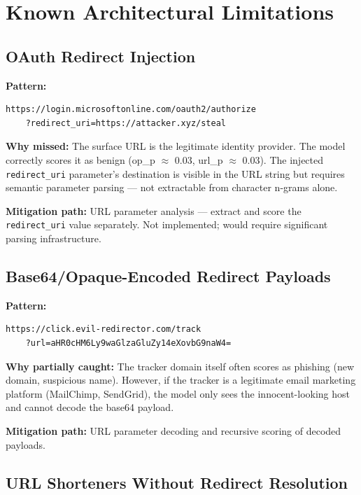\documentclass[11pt,a4paper]{article}
\newcommand{\code}[1]{\texttt{#1}}
\begin{document}
\section{Known Architectural Limitations}

\subsection{OAuth Redirect Injection}

\textbf{Pattern:}
\begin{lstlisting}
https://login.microsoftonline.com/oauth2/authorize
    ?redirect_uri=https://attacker.xyz/steal
\end{lstlisting}

\textbf{Why missed:} The surface URL is the legitimate identity
provider. The model correctly scores it as benign (op\_p $\approx$
0.03, url\_p $\approx$ 0.03). The injected \code{redirect\_uri}
parameter's destination is visible in the URL string but requires
semantic parameter parsing --- not extractable from character n-grams
alone.

\textbf{Mitigation path:} URL parameter analysis --- extract and score
the \code{redirect\_uri} value separately. Not implemented; would
require significant parsing infrastructure.

\subsection{Base64/Opaque-Encoded Redirect Payloads}

\textbf{Pattern:}
\begin{lstlisting}
https://click.evil-redirector.com/track
    ?url=aHR0cHM6Ly9waGlzaGluZy14eXovbG9naW4=
\end{lstlisting}

\textbf{Why partially caught:} The tracker domain itself often scores
as phishing (new domain, suspicious name). However, if the tracker is
a legitimate email marketing platform (MailChimp, SendGrid), the model
only sees the innocent-looking host and cannot decode the base64
payload.

\textbf{Mitigation path:} URL parameter decoding and recursive scoring
of decoded payloads.

\subsection{URL Shorteners Without Redirect Resolution}
\end{document}

